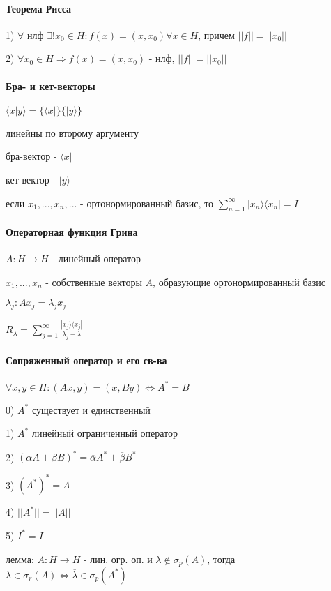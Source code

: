 \documentclass[russian,twocolumn]{article}
\begin{document}
\paragraph{Теорема Рисса}

1) $\forall$ нлф $\exists!x_0\in H : f(x) = (x, x_0)\forall x\in H$, причем $||f||=||x_0||$

2) $\forall x_0 \in H \Rightarrow f(x) = (x,x_0)$ - нлф, $||f||=||x_0||$

\paragraph{Бра- и кет-векторы}

$\langle x|y \rangle = \{\langle x | \} \{ | y \rangle \}$

линейны по второму аргументу

бра-вектор - $\langle x | $ 

кет-вектор - $| y \rangle $

если $x_1,...,x_n,...$ - ортонормированный базис, то $\sum _{n=1}^\infty |x_n \rangle \langle x_n| = I$

\paragraph{Операторная функция Грина}

$A:H \to H$ - линейный оператор

$x_1,...,x_n$ - собственные векторы $A$, образующие ортонормированный базис

$\lambda_j : Ax_j = \lambda_j x_j$

$R_\lambda = \sum_{j=1}^\infty \frac{|x_j \rangle \langle x_j|}{\lambda_j - \lambda}$

\paragraph{Сопряженный оператор и его св-ва}

$\forall x,y \in H : (Ax,y) = (x,By) \iff A^* = B$

0) $A^*$ существует и единственный

1) $A^*$ линейный ограниченный оператор

2) $(\alpha A + \beta B)^* = \overline{\alpha}A^* + \overline{\beta}B^*$

3) $(A^*)^* = A$

4) $||A^*|| = ||A||$

5) $I^* = I$

лемма: $A:H \to H$ - лин. огр. оп. и $\lambda \notin \sigma_p(A)$, тогда $\lambda \in \sigma_r (A) \iff \overline{\lambda} \in \sigma_p(A^*)$ 
\end{document}
